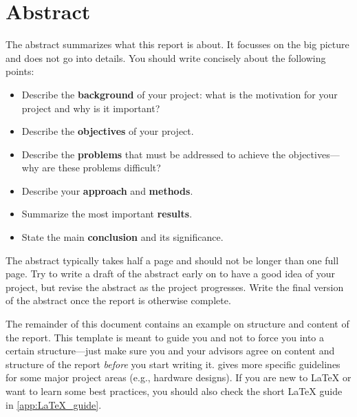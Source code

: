 \chapter*{Abstract}

 {\color{red}
  The abstract summarizes what this report is about.
  It focusses on the big picture and does not go into details.
  You should write concisely about the following points:

  \begin{itemize}
	  \item Describe the \textbf{background} of your project: what is the motivation for your project and why is it important?
	  \item Describe the \textbf{objectives} of your project.
	  \item Describe the \textbf{problems} that must be addressed to achieve the objectives---why are these problems difficult?
	  \item Describe your \textbf{approach} and \textbf{methods}.
	  \item Summarize the most important \textbf{results}.
	  \item State the main \textbf{conclusion} and its significance.
  \end{itemize}

  The abstract typically takes half a page and should not be longer than one full page.
  Try to write a draft of the abstract early on to have a good idea of your project, but revise the abstract as the project progresses.
  Write the final version of the abstract once the report is otherwise complete.

  The remainder of this document contains an example on structure and content of the report.
  This template is meant to guide you and not to force you into a certain structure---just make sure you and your advisors agree on content and structure of the report \emph{before} you start writing it.
   gives more specific guidelines for some major project areas (e.g., hardware designs).
  If you are new to \LaTeX{} or want to learn some best practices, you should also check the short \LaTeX{} guide in \cref{app:LaTeX_guide}.
 }
